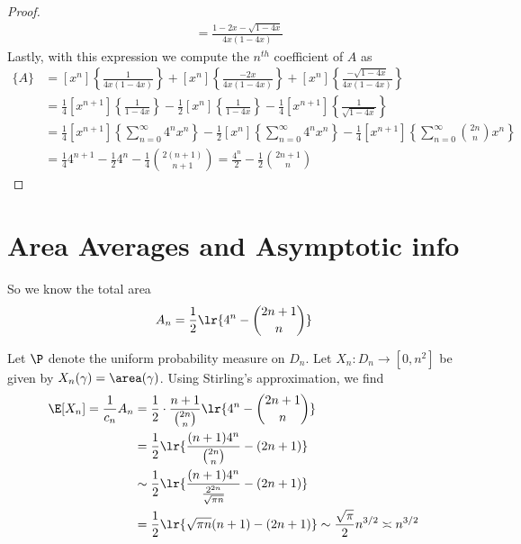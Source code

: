 \documentclass[12pt]{article}
\begin{document}
\begin{proof}
\begin{align*}
    &= \frac{1-2x-\sqrt{1-4x}}{4x(1-4x)}
  \end{align*}
  Lastly, with this expression we compute the $ n^{th} $ coefficient of $ A $ as
  \begin{align*}
    [x^{n}]\{A\} &= [x^{n}]\left\{\frac{1}{4x(1-4x)}\right\} + [x^{n}]\left\{\frac{-2x}{4x(1-4x)}\right\} + [x^{n}]\left\{\frac{-\sqrt{1-4x}}{4x(1-4x)}\right\} \\
    &= \frac{1}{4}[x^{n+1}]\left\{\frac{1}{1-4x}\right\} -\frac{1}{2} [x^{n}]\left\{\frac{1}{1-4x}\right\} -\frac{1}{4} [x^{n+1}]\left\{\frac{1}{\sqrt{1-4x}}\right\} \\
    &=\frac{1}{4}[x^{n+1}]\left\{\sum_{n=0}^{\infty}4^{n}x^{n}\right\} -\frac{1}{2} [x^{n}]\left\{\sum_{n=0}^{\infty}4^{n}x^{n}\right\} -\frac{1}{4} [x^{n+1}]\left\{\sum_{n=0}^{\infty}\binom{2n}{n}x^{n}\right\} \\
    &= \frac{1}{4}4^{n+1} - \frac{1}{2}4^{n} -\frac{1}{4}\binom{2(n+1)}{n+1} = \frac{4^{n}}{2} - \frac{1}{2}\binom{2n+1}{n}
  \end{align*}

\end{proof}



\section{Area Averages and Asymptotic info}

So we know the total area 
\[
  A_{n} = \frac{1}{2}\lr{4^{n} - \binom{2n+1}{n}}
\]

Let $ \P $ denote the uniform probability measure on $ D_{n} $. Let $ X_{n}:D_{n}\to [0,n^{2}] $ be given by $ X_{n}(\gamma) = \area(\gamma) $. Using Stirling's approximation, we find
\begin{align*}
  \E[X_{n}] = \frac{1}{c_{n}}A_{n} &= \frac{1}{2}\cdot\frac{n+1}{\binom{2n}{n}} \lr{4^{n} - \binom{2n+1}{n}}\\
  &= \frac{1}{2} \lr{\frac{(n+1)4^{n}}{\binom{2n}{n}} - (2n+1)}\\
  &\sim \frac{1}{2} \lr{\frac{(n+1)4^{n}}{\frac{2^{2n}}{\sqrt{\pi n}}} - (2n+1)}\\
  &=\frac{1}{2} \lr{\sqrt{\pi n}(n+1)- (2n+1)} \sim \frac{\sqrt{\pi}}{2} n^{3/2} \asymp n^{3/2}
\end{align*}
\end{document}
